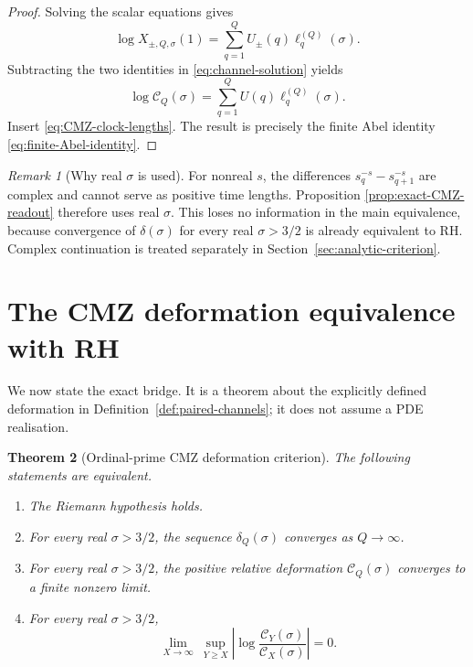\documentclass[11pt]{amsart}
\numberwithin{equation}{section}
\theoremstyle{plain}
\newtheorem{theorem}{Theorem}[section]
\theoremstyle{definition}
\theoremstyle{remark}
\newtheorem{remark}[theorem]{Remark}
\begin{document}
\begin{proof}
Solving the scalar equations gives
\begin{equation}
\log X_{\pm,Q,\sigma}(1)
=\sum_{q=1}^{Q}U_\pm(q)\ell_q^{(Q)}(\sigma).
\label{eq:channel-solution}
\end{equation}
Subtracting the two identities in \eqref{eq:channel-solution} yields
\begin{equation}
\log\mathscr C_Q(\sigma)
=\sum_{q=1}^{Q}U(q)\ell_q^{(Q)}(\sigma).
\label{eq:channel-difference}
\end{equation}
Insert \eqref{eq:CMZ-clock-lengths}.  The result is precisely the finite Abel
identity \eqref{eq:finite-Abel-identity}.
\end{proof}

\begin{remark}[Why real $\sigma$ is used]
\label{rem:real-sigma}
For nonreal $s$, the differences $s_q^{-s}-s_{q+1}^{-s}$ are complex and
cannot serve as positive time lengths.  Proposition
\ref{prop:exact-CMZ-readout} therefore uses real $\sigma$.  This loses no
information in the main equivalence, because convergence of $\delta(\sigma)$
for every real $\sigma>3/2$ is already equivalent to RH.  Complex continuation
is treated separately in Section~\ref{sec:analytic-criterion}.
\end{remark}

\section{The CMZ deformation equivalence with RH}
\label{sec:main-equivalence}

We now state the exact bridge.  It is a theorem about the explicitly defined
deformation in Definition~\ref{def:paired-channels}; it does not assume a PDE
realisation.

\begin{theorem}[Ordinal-prime CMZ deformation criterion]
\label{thm:CMZ-RH-equivalence}
The following statements are equivalent.
\begin{enumerate}[label=\textup{(\roman*)},leftmargin=*]
\item The Riemann hypothesis holds.
\item For every real $\sigma>3/2$, the sequence
$\delta_Q(\sigma)$ converges as $Q\to\infty$.
\item For every real $\sigma>3/2$, the positive relative deformation
$\mathscr C_Q(\sigma)$ converges to a finite nonzero limit.
\item For every real $\sigma>3/2$,
\begin{equation}
\lim_{X\to\infty}\ 
\sup_{Y\ge X}
\left|
\log\frac{\mathscr C_Y(\sigma)}{\mathscr C_X(\sigma)}
\right|=0.
\label{eq:CMZ-tail-criterion}
\end{equation}
\end{enumerate}
\end{theorem}
\end{document}

